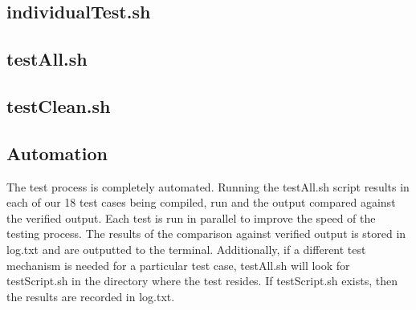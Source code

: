 \subsection{individualTest.sh}

\subsection{testAll.sh}

\subsection{testClean.sh}

\subsection{Automation}
The test process is completely automated. Running the testAll.sh script results in each of our 18 test cases being 
compiled, run and the output compared against the verified output. Each test is run in parallel to improve the speed 
of the testing process. The results of the comparison against verified output is stored in log.txt and are outputted to
the terminal. Additionally, if a different test mechanism is needed for a particular test case, testAll.sh will look 
for testScript.sh in the directory where the test resides. If testScript.sh exists, then the results are recorded in log.txt.


